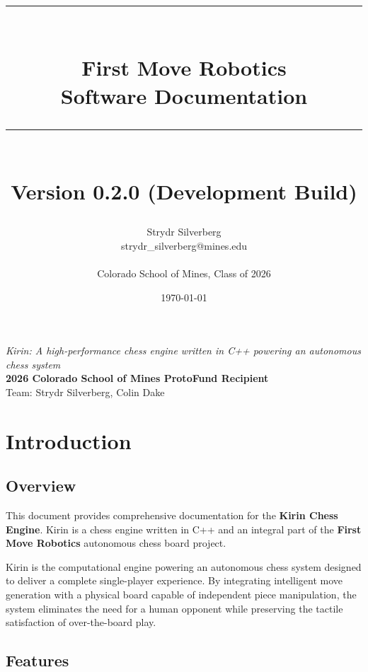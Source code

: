\documentclass[11pt,a4paper]{report}
\title{%
    \vspace{-1cm}
    \rule{\textwidth}{1pt}\\[0.5cm]
    {\Huge\bfseries First Move Robotics}\\[0.3cm]
    {\Large Software Documentation}\\[0.3cm]
    \rule{\textwidth}{1pt}\\[1cm]
    {\large Version 0.2.0 (Development Build)}
}
\author{Strydr Silverberg\\strydr\_silverberg@mines.edu\\\\Colorado School of Mines, Class of 2026}
\date{\today}
\begin{document}
\maketitle
\thispagestyle{empty}

\vfill
\begin{center}
    \textit{Kirin: A high-performance chess engine written in C++ powering an autonomous chess system}\\[1em]
    \textbf{2026 Colorado School of Mines ProtoFund Recipient}\\
    Team: Strydr Silverberg, Colin Dake
\end{center}
\vfill

\newpage
\tableofcontents
\newpage

\chapter{Introduction}

\section{Overview}

This document provides comprehensive documentation for the \textbf{Kirin Chess Engine}. Kirin is a chess engine written in C++ and an integral part of the \textbf{First Move Robotics} autonomous chess board project.

Kirin is the computational engine powering an autonomous chess system designed to deliver a complete single-player experience. By integrating intelligent move generation with a physical board capable of independent piece manipulation, the system eliminates the need for a human opponent while preserving the tactile satisfaction of over-the-board play.

\section{Features}
\end{document}
